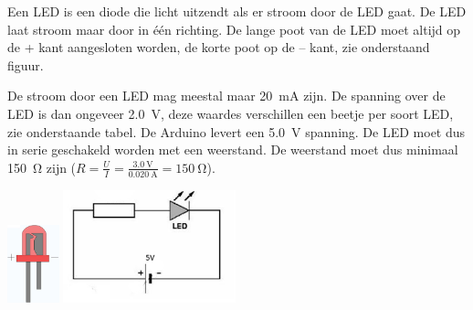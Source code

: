 \documentclass{arduino}
\begin{document}
\begin{minipage}[m]{0.6\textwidth}
Een LED is een diode die licht uitzendt als er stroom door de LED gaat. De LED laat stroom maar door in één richting. De lange poot van de LED moet altijd op de + kant aangesloten worden, de korte poot op de – kant, zie onderstaand figuur.

De stroom door een LED mag meestal maar \SI{20}{\milli\ampere} zijn. De spanning over de LED is dan ongeveer \SI{2.0}{\volt}, deze waardes verschillen een beetje per soort LED, zie onderstaande tabel. De Arduino levert een \SI{5.0}{\volt} spanning. De LED moet dus in serie geschakeld worden met een weerstand. De weerstand moet dus minimaal \SI{150}{\ohm} zijn ($R = \frac{U}{I} = \frac{\SI{3.0}{\volt}}{\SI{0.020}{\ampere}} = \SI{150}{\ohm}$).
\end{minipage}\hfill\begin{minipage}[m]{0.39\textwidth}
\raggedleft
\includegraphics[width=1.5cm]{5. Component LED}
\includegraphics[width=5cm]{6. LED circuit}
\end{minipage}
\end{document}
